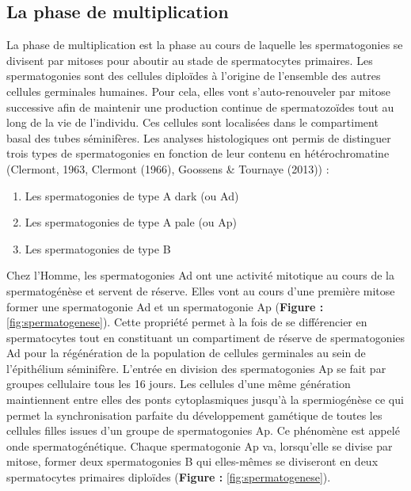 \documentclass[12pt,twoside]{reedthesis}
\providecommand{\tightlist}{%
  \setlength{\itemsep}{0pt}\setlength{\parskip}{0pt}}
\theoremstyle{definition}
\theoremstyle{definition}
\theoremstyle{remark}
\begin{document}
  \subsection{La phase de
  multiplication}\label{la-phase-de-multiplication}
  
  La phase de multiplication est la phase au cours de laquelle les
  spermatogonies se divisent par mitoses pour aboutir au stade de
  spermatocytes primaires. Les spermatogonies sont des cellules diploïdes
  à l'origine de l'ensemble des autres cellules germinales humaines. Pour
  cela, elles vont s'auto-renouveler par mitose successive afin de
  maintenir une production continue de spermatozoïdes tout au long de la
  vie de l'individu. Ces cellules sont localisées dans le compartiment
  basal des tubes séminifères. Les analyses histologiques ont permis de
  distinguer trois types de spermatogonies en fonction de leur contenu en
  hétérochromatine (Clermont, 1963, Clermont (1966), Goossens \& Tournaye
  (2013)) :
  
  \begin{enumerate}
  \def\labelenumi{\arabic{enumi}.}
  \tightlist
  \item
    Les spermatogonies de type A dark (ou Ad)\\
  \item
    Les spermatogonies de type A pale (ou Ap)\\
  \item
    Les spermatogonies de type B
  \end{enumerate}
  
  Chez l'Homme, les spermatogonies Ad ont une activité mitotique au cours
  de la spermatogénèse et servent de réserve. Elles vont au cours d'une
  première mitose former une spermatogonie Ad et un spermatogonie Ap
  (\textbf{Figure :} \ref{fig:spermatogenese}). Cette propriété permet à
  la fois de se différencier en spermatocytes tout en constituant un
  compartiment de réserve de spermatogonies Ad pour la régénération de la
  population de cellules germinales au sein de l'épithélium séminifère.
  L'entrée en division des spermatogonies Ap se fait par groupes
  cellulaire tous les 16 jours. Les cellules d'une même génération
  maintiennent entre elles des ponts cytoplasmiques jusqu'à la
  spermiogénèse ce qui permet la synchronisation parfaite du développement
  gamétique de toutes les cellules filles issues d'un groupe de
  spermatogonies Ap. Ce phénomène est appelé onde spermatogénétique.
  Chaque spermatogonie Ap va, lorsqu'elle se divise par mitose, former
  deux spermatogonies B qui elles-mêmes se diviseront en deux
  spermatocytes primaires diploïdes (\textbf{Figure :}
  \ref{fig:spermatogenese}).
  
\end{document}
